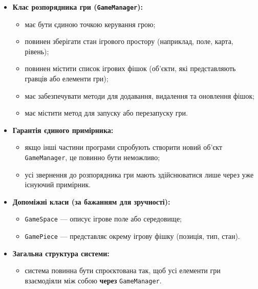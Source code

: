 \documentclass[12pt,a4paper]{article}
\begin{document}
    \begin{itemize}
        \item \textbf{Клас розпорядника гри (\texttt{GameManager}):}
        \begin{itemize}
            \item має бути єдиною точкою керування грою;
            \item повинен зберігати стан ігрового простору 
            (наприклад, поле, карта, рівень);
            \item повинен містити список ігрових фішок 
            (об’єкти, які представляють гравців або елементи гри);
            \item має забезпечувати методи для додавання, видалення 
            та оновлення фішок;
            \item має містити метод для запуску або перезапуску гри.
        \end{itemize}

        \item \textbf{Гарантія єдиного примірника:}
        \begin{itemize}
            \item якщо інші частини програми спробують створити новий об’єкт 
            \texttt{GameManager}, це повинно бути неможливо;
            \item усі звернення до розпорядника гри мають здійснюватися 
            лише через уже існуючий примірник.
        \end{itemize}

        \item \textbf{Допоміжні класи (за бажанням для зручності):}
        \begin{itemize}
            \item \texttt{GameSpace} --- описує ігрове поле або середовище;
            \item \texttt{GamePiece} --- представляє окрему ігрову фішку 
            (позиція, тип, стан).
        \end{itemize}

        \item \textbf{Загальна структура системи:}
        \begin{itemize}
            \item система повинна бути спроєктована так, щоб усі елементи гри 
            взаємодіяли між собою \textbf{через} \texttt{GameManager}.
        \end{itemize}
    \end{itemize}
\end{document}
